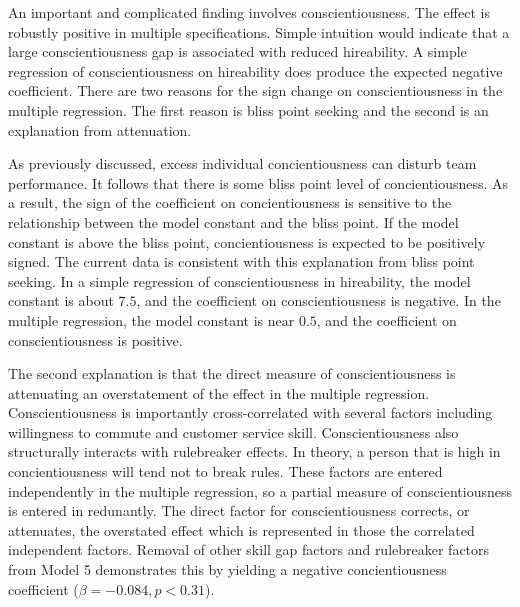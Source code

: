 \documentclass[review]{elsarticle}
\begin{document}
An important and complicated finding involves conscientiousness.
The effect is robustly positive in multiple specifications.
Simple intuition would indicate that a large conscientiousness gap is associated with reduced hireability.
A simple regression of conscientiousness on hireability does produce the expected negative coefficient.
There are two reasons for the sign change on conscientiousness in the multiple regression.
The first reason is bliss point seeking and the second is an explanation from attenuation.

As previously discussed, excess individual concientiousness can disturb team performance\cite{curcseu2019personality}.
It follows that there is some bliss point level of concientiousness.
As a result, the sign of the coefficient on concientiousness is sensitive to the relationship between the model constant and the bliss point.
If the model constant is above the bliss point, concientiousness is expected to be positively signed.
The current data is consistent with this explanation from bliss point seeking.
In a simple regression of conscientiousness in hireability, the model constant is about $7.5$, and the coefficient on conscientiousness is negative.
In the multiple regression, the model constant is near $0.5$, and the coefficient on conscientiousness is positive.


The second explanation is that the direct measure of conscientiousness is attenuating an overstatement of the effect in the multiple regression.
Conscientiousness is importantly cross-correlated with several factors including willingness to commute and customer service skill.
Conscientiousness also structurally interacts with rulebreaker effects.
In theory, a person that is high in concientiousness will tend not to break rules.
These factors are entered independently in the multiple regression, so a partial measure of conscientiousness is entered in redunantly.
The direct factor for conscientiousness corrects, or attenuates, the overstated effect which is represented in those the correlated independent factors.
Removal of other skill gap factors and rulebreaker factors from Model 5 demonstrates this by yielding a negative concientiousness coefficient ($\beta = -0.084, p < 0.31$).
\end{document}
